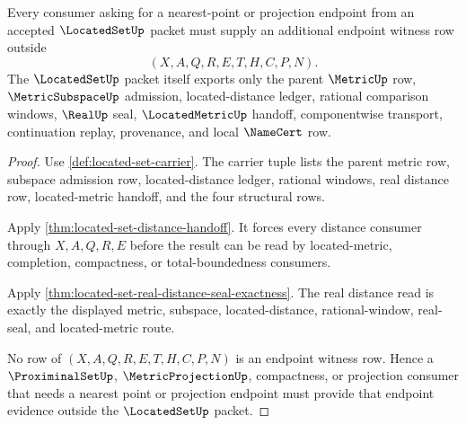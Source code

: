 \begin{theorem}
\label{thm:located-set-nearest-point-refusal-boundary}
Every consumer asking for a nearest-point or projection endpoint from an accepted $\LocatedSetUp$ packet must supply an additional endpoint witness row outside
$$
(X,A,Q,R,E,T,H,C,P,N).
$$
The $\LocatedSetUp$ packet itself exports only the parent $\MetricUp$ row, $\MetricSubspaceUp$ admission, located-distance ledger, rational comparison windows, $\RealUp$ seal, $\LocatedMetricUp$ handoff, componentwise transport, continuation replay, provenance, and local $\NameCert$ row.
\end{theorem}
\begin{proof}
Use \autoref{def:located-set-carrier}. The carrier tuple lists the parent metric row, subspace admission row, located-distance ledger, rational windows, real distance row, located-metric handoff, and the four structural rows.

Apply \autoref{thm:located-set-distance-handoff}. It forces every distance consumer through $X,A,Q,R,E$ before the result can be read by located-metric, completion, compactness, or total-boundedness consumers.

Apply \autoref{thm:located-set-real-distance-seal-exactness}. The real distance read is exactly the displayed metric, subspace, located-distance, rational-window, real-seal, and located-metric route.

No row of $(X,A,Q,R,E,T,H,C,P,N)$ is an endpoint witness row. Hence a $\ProximinalSetUp$, $\MetricProjectionUp$, compactness, or projection consumer that needs a nearest point or projection endpoint must provide that endpoint evidence outside the $\LocatedSetUp$ packet.
\end{proof}

